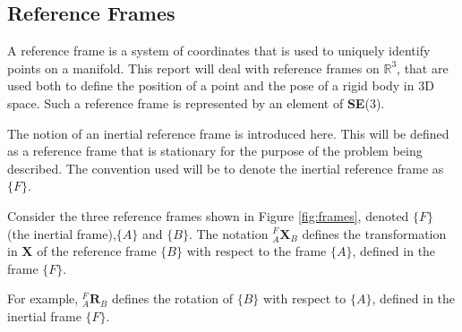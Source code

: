 		\begin{comment}		
		\textbf{Adjoint Map}\\
		EXPLANATION\\
		The adjoint map of $\mathbf{SE}(3)$ is
		\begin{equation}
			\Psi_S: \mathbf{SE}(3) \rightarrow \mathbf{SE}(3) \textnormal{, }
			\Psi_S(A) \stackrel{\Delta}{=} SAS^{-1}
		\end{equation}
		Taking the derivative:
		\begin{equation}
			\frac{\partial}{\partial t} \Psi_S(A(t))|_{t=0} = SBS^{-1} \textnormal{, }
			B \stackrel{\Delta}{=} 	\frac{\partial}{\partial t}A(t)|_{t=0}
		\end{equation}
		The adjoint	representation of $\mathbf{SE}(3)$ is given by the mapping
		\begin{equation}
			\textbf{Adj}_S: \mathfrak{se}(3) \rightarrow \mathfrak{se}(3) \textnormal{, }
			\textbf{Adj}_S(B) \stackrel{\Delta}{=} SBS^{-1}
		\end{equation}
		\end{comment}
		
	\subsection{Reference Frames}
		A reference frame is a system of coordinates that is used to uniquely identify points on a manifold. This report will deal with reference frames on $\mathbb{R}^3$, that are used both to define the position of a point and the pose of a rigid body in 3D space.
		Such a reference frame is represented by an element of \textbf{SE}(3).
		
		The notion of an inertial reference frame is introduced here. This will be defined as a reference frame that is stationary for the purpose of the problem being described. The convention used will be to denote the inertial reference frame as $\{F\}$.
		
		Consider the three reference frames shown in Figure \ref{fig:frames}, denoted $\{F\}$ (the inertial frame),$\{A\}$ and $\{B\}$.
		The notation $^{F}_{A}\mathbf{X}^{}_{B}$ defines the transformation in $\mathbf{X}$ of the reference frame $\{B\}$ with respect to the frame $\{A\}$, defined in the frame $\{F\}$.
		
		
		For example, $^{F}_{A}\mathbf{R}^{}_{B}$ defines the rotation of $\{B\}$ with respect to $\{A\}$, defined in the inertial frame $\{F\}$.		
		
